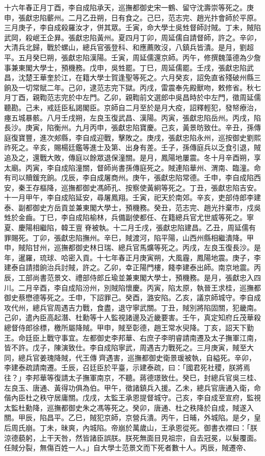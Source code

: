 \begin{pinyinscope}
十六年春正月丁酉，李自成陷承天，巡撫都御史宋一鶴、留守沈壽崇等死之。庚申，張獻忠陷蘄州。二月乙丑朔，日有食之。己巳，范志完、趙光抃會師於平原。三月庚子，李自成殺羅汝才，併其眾。壬寅，命大學士吳甡督師討賊。丁未，賊陷武岡，殺岷王企昪。張獻忠陷黃州。夏四月丁卯，周延儒自請督師，許之。辛卯，大清兵北歸，戰於螺山，總兵官張登科、和應薦敗沒，八鎮兵皆潰。是月，劉超平。五月癸巳朔，張獻忠陷漢陽。壬寅，周延儒還京師。丙午，修撰魏藻德為少詹事兼東閣大學士，預機務。戊申，吳甡罷。丁巳，周延儒罷。壬戌，張獻忠陷武昌，沈楚王華奎於江，在籍大學士賀逢聖等死之。六月癸亥，詔免直省殘破州縣三餉及一切常賦二年。己卯，逮范志完下獄。丙戌，雷震奉先殿獸吻，敕修省。秋七月丁酉，親鞫范志完於中左門。乙卯，親鞫前文選郎中吳昌時於中左門，徵周延儒聽勘。己未，戒廷臣私謁閣臣。京師自二月至於是月大疫，詔釋輕犯，發帑療治，瘞五城暴骸。八月壬戌朔，左良玉復武昌、漢陽。丙寅，張獻忠陷岳州。丙戌，陷長沙。庚寅，陷衡州。九月丙申，張獻忠陷寶慶。己亥，黃景昉致仕。辛丑，孫傳庭復寶豐，進次郟縣，李自成迎戰，擊敗之。庚戌，張獻忠陷永州，巡按御史劉熙祚死之。辛亥，賜楊廷鑑等進士及第、出身有差。壬子，孫傳庭兵以乏食引退，賊追及之，還戰大敗，傳庭以餘眾退保潼關。是月，鳳陽地屢震。冬十月辛酉朔，享太廟。丙寅，李自成陷潼關，督師尚書孫傳庭死之。賊連陷華州、渭南、臨潼。命有司以贖鍰充餉。戊辰，李自成屠商州。庚午，張獻忠陷常德。壬申，李自成陷西安，秦王存樞降，巡撫都御史馮師孔、按察使黃絅等死之。丁丑，張獻忠陷吉安。十一月甲午，李自成陷延安，尋屠鳳翔。壬寅，祀天於南郊。辛亥，吏部侍郎李建泰、副都御史方岳貢並兼東閣大學士，預機務。癸丑，范志完、趙光抃棄市，戍吳甡於金齒。丁巳，李自成陷榆林，兵備副使都任、在籍總兵官尤世威等死之。寧夏、慶陽相繼陷，韓王亶脊被執。十二月壬戌，張獻忠陷建昌。乙丑，周延儒有罪賜死。丁卯，張獻忠陷撫州。辛巳，賊渡河，陷平陽，山西州縣相繼潰降。甲申，賊陷甘州，巡撫都御史林日瑞、總兵官馬爌等死之。丙戌，左良玉復長沙。是年，暹羅，琉球、哈密入貢。十七年春正月庚寅朔，大風霾，鳳陽地震。庚子，李建泰自請措餉治兵討賊，許之。乙卯，幸正陽門樓，餞李建泰出師。南京地震。丙辰，工部尚書范景文、禮部侍郎丘瑜並兼東閣大學士，預機務。是月，張獻忠入四川。二月辛酉，李自成陷汾州，別賊陷懷慶。丙寅，陷太原，執晉王求桂，巡撫都御史蔡懋德等死之。壬申，下詔罪己。癸酉，潞安陷。乙亥，議京師城守。李自成攻代州，總兵官周遇吉力戰，食盡，退守寧武關。丁丑，賊別將陷固關，犯畿南。己卯，遣內臣高起潛、杜勳等十人監視諸邊及近畿要害。壬午，真定知府丘茂華殺總督侍郎徐標，檄所屬降賊。甲申，賊至彰德，趙王常水臾降。丁亥，詔天下勤王。命廷臣上戰守事宜。左都御史李邦華、右庶子李明睿請南遷及太子撫軍江南，皆不許。戊子，陳演致仕。李自成陷寧武，周遇吉力戰死之。三月庚寅，賊至大同，總兵官姜瑰降賊，代王傳齊遇害，巡撫都御史衛景瑗被執，自縊死。辛卯，李建泰疏請南遷。壬辰，召廷臣於平臺，示建泰疏，曰：「國君死社稷，朕將焉往？」李邦華等復請太子撫軍南京，不聽。蔣德璟致仕。癸巳，封總兵官吳三桂、左良玉、唐通、黃得功俱為伯。甲午，徵諸鎮兵入援。乙未，總兵官唐通入衛，命偕內臣杜之秩守居庸關。戊戌，太監王承恩提督城守。己亥，李自成至宣府，監視太監杜勳降，巡撫都御史朱之馮等死之。癸卯，唐通、杜之秩降於自成，賊遂入關。甲辰，陷昌平。乙巳，賊犯京師，京營兵潰。丙午，日晡，外城陷。是夕，皇后周氏崩。丁未，昧爽，內城陷。帝崩於萬歲山，王承恩從死。御書衣襟曰：「朕涼德藐躬，上干天咎，然皆諸臣誤朕。朕死無面目見祖宗，自去冠冕，以髮覆面。任賊分裂，無傷百姓一人。」自大學士范景文而下死者數十人。丙辰，賊遷帝、
\end{pinyinscope}
